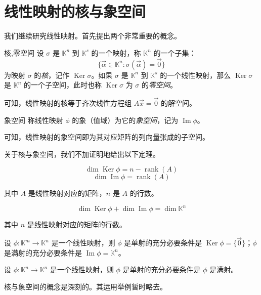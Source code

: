 
\section{线性映射的核与象空间}

我们继续研究线性映射。首先提出两个非常重要的概念。

\begin{definition}{核,零空间}
	设 $\sigma$ 是 $\mathbb K^n$ 到 $\mathbb K^s$ 的一个映射，称 $\mathbb K^n$ 的一个子集：
	$$
	\{ \vec \alpha \in \mathbb K^n \colon \sigma (\vec \alpha) = \vec 0 \}
	$$
	为映射 $\sigma$ 的\emph{核}，记作 $\operatorname{Ker} \sigma$。如果 $\sigma$ 是 $\mathbb K^n$ 到 $\mathbb K^s$ 的一个线性映射，那么 $\operatorname{Ker} \sigma$ 是 $\mathbb K^n$ 的一个子空间，此时也称 $\operatorname{Ker} \sigma$ 为 $\sigma$ 的\emph{零空间}。
\end{definition}

可知，线性映射的核等于齐次线性方程组 $A \vec x = \vec 0$ 的解空间。

\begin{definition}{象空间}
	称线性映射 $\phi$ 的象（值域）为它的\emph{象空间}，记为 $\operatorname{Im} \phi$。
\end{definition}

可知，线性映射的象空间即为其对应矩阵的列向量张成的子空间。

关于核与象空间，我们不加证明地给出以下定理。

\begin{theorem}
	$$
	\dim \operatorname{Ker} \phi = n - \operatorname{rank}(A)
	$$$$
	\dim \operatorname{Im} \phi = \operatorname{rank}(A)
	$$

	其中 $A$ 是线性映射对应的矩阵，$n$ 是 $A$ 的行数。
\end{theorem}

\begin{theorem}
	$$
	\dim \operatorname{Ker} \phi + \dim \operatorname{Im} \phi = \dim \mathbb K^n
	$$

	其中 $n$ 是线性映射对应的矩阵的行数。
\end{theorem}

\begin{theorem}
	设 $\phi \colon \mathbb K^m \to \mathbb K^n$ 是一个线性映射，则 $\phi$ 是单射的充分必要条件是 $\operatorname{Ker} \phi = \{ \vec 0 \}$；$\phi$ 是满射的充分必要条件是 $\operatorname{Im} \phi = \mathbb K^n$。
\end{theorem}

\begin{theorem}
	设 $\phi \colon \mathbb K^n \to \mathbb K^n$ 是一个线性映射，则 $\phi$ 是单射的充分必要条件是 $\phi$ 是满射。
\end{theorem}

核与象空间的概念是深刻的。其运用举例暂时略去。

